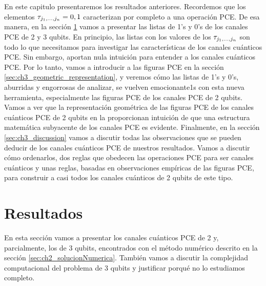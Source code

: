 En este capitulo presentaremos los resultados anteriores.
Recordemos que los elementos $\tau_{j_1,\ldots ,j_n}=0,1$ caracterizan por completo a una 
operación PCE. De esa manera, en la sección \ref{sec:ch3_resultados} vamos a presentar
las listas de 1's y 0's de los canales PCE de 2 y 3 qubits. En principio, las 
listas con los valores de los $\tau_{j_1,\ldots ,j_n}$ son todo lo que necesitamos para investigar las características de 
los canales cuánticos PCE. Sin embargo, aportan nula intuición para entender
a los canales cuánticos PCE. Por lo tanto,
vamos a introducir a las figuras PCE en la sección 
\ref{sec:ch3_geometric_representation}, y veremos cómo las listas de 1's y 0's,
aburridas y engorrosas de analizar, se vuelven emocionante1s con esta 
nueva herramienta, especialmente las figuras PCE de los canales 
PCE de 2 qubits.
Vamos a ver que la representación geométrica de las figuras PCE de 
los canales cuánticos PCE de 2 qubits en la
 proporcionan intuición de 
que una estructura matemática subyacente de los canales PCE es evidente.
Finalmente, en la sección \ref{sec:ch3_discussion} vamos a discutir 
todas las observaciones que se pueden deducir de los canales cuánticos PCE
de nuestros resultados. Vamos a discutir cómo ordenarlos, dos reglas 
que obedecen las operaciones PCE para ser canales cuánticos y unas 
reglas, basadas en observaciones empíricas de las figuras PCE, para 
construir a casi todos los canales cuánticos de 2 qubits de este tipo. 

\section{Resultados}\label{sec:ch3_resultados} %
En esta sección vamos a presentar los canales cuánticos PCE de 2 y,
parcialmente, los de 3 qubits, 
encontrados con el método numérico descrito en la sección 
\ref{sec:ch2_solucionNumerica}. También vamos a discutir la complejidad 
computacional del problema de 3 qubits y justificar porqué no lo estudiamos completo.

